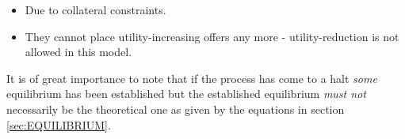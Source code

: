 \documentclass[../Bachelorarbeit.tex]{subfiles}
\begin{document}
\begin{itemize}
\item Due to collateral constraints.
\item They cannot place utility-increasing offers any more - utility-reduction is not allowed in this model.
\end{itemize}

It is of great importance to note that if the process has come to a halt \textit{some} equilibrium has been established but the established equilibrium \textit{must not} necessarily be the theoretical one as given by the equations in section \ref{sec:EQUILIBRIUM}.
\end{document}
